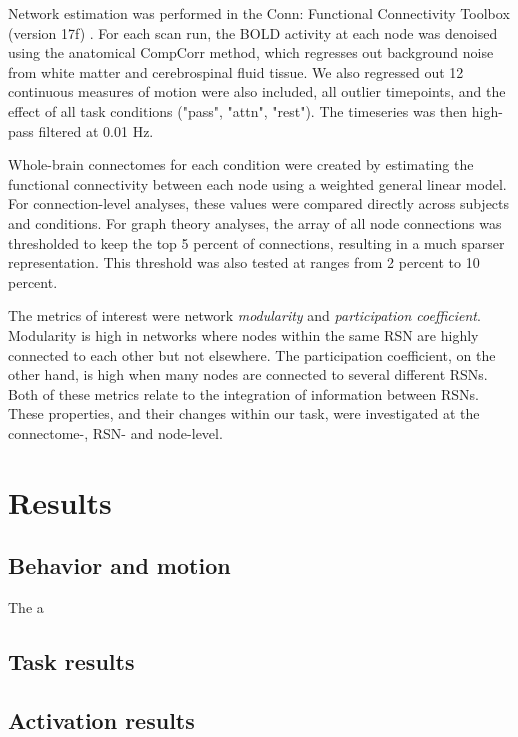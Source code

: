Network estimation was performed in the Conn: Functional Connectivity Toolbox (version 17f) \cite{Nieto-castanon}. For each scan run, the BOLD activity at each node was denoised using the anatomical CompCorr method, which regresses out background noise from white matter and cerebrospinal fluid tissue. We also regressed out 12 continuous measures of motion were also included, all outlier timepoints, and the effect of all task conditions ("pass", "attn", "rest"). The timeseries was then high-pass filtered at 0.01 Hz.

Whole-brain connectomes for each condition were created by estimating the functional connectivity between each node using a weighted general linear model. For connection-level analyses, these values were compared directly across subjects and conditions. For graph theory analyses, the array of all node connections was thresholded to keep the top 5 percent of connections, resulting in a much sparser representation. This threshold was also tested at ranges from 2 percent to 10 percent.

The metrics of interest were network \textit{modularity} and \textit{participation coefficient}. Modularity is high in networks where nodes within the same RSN are highly connected to each other but not elsewhere. The participation coefficient, on the other hand, is high when many nodes are connected to several different RSNs. Both of these metrics relate to the integration of information between RSNs. These properties, and their changes within our task, were investigated at the connectome-, RSN- and node-level. 

\section{Results}

\subsection{Behavior and motion}

The a

\subsection{Task results}

\subsection{Activation results}

